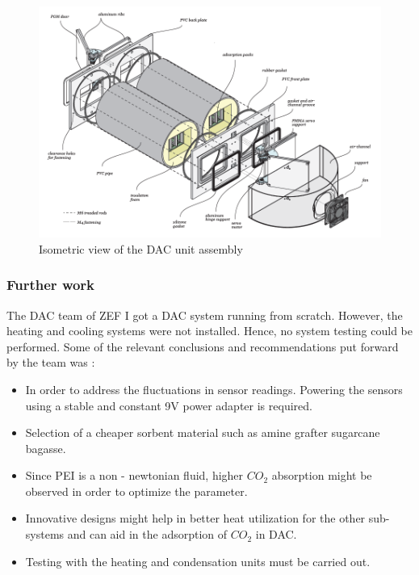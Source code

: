 \begin{figure}[H]
    \centering
    \includegraphics[width=\linewidth]{images/previouswork/zef1ass.png}
    \caption{Isometric view of the DAC unit assembly \cite{Azzalini2018}}
    \label{fig:zef1ass}
\end{figure}

\subsubsection{Further work}
The DAC team of ZEF I got a DAC system running from scratch. However, the heating and cooling systems were not installed. Hence, no system testing could be performed. Some of the relevant conclusions and recommendations put forward by the team was :

\begin{itemize}
    \item In order to address the fluctuations in sensor readings. Powering the sensors using a stable and constant 9V power adapter is required. 
    \item Selection of a cheaper sorbent material such as amine grafter sugarcane bagasse. 
    \item Since PEI is a non - newtonian fluid, higher $CO_2$ absorption might be observed in order to optimize the parameter. 
    \item Innovative designs might help in better heat utilization for the other sub-systems and can aid in the adsorption of $CO_2$ in DAC. 
    \item Testing with the heating and condensation units must be carried out. 
\end{itemize}

